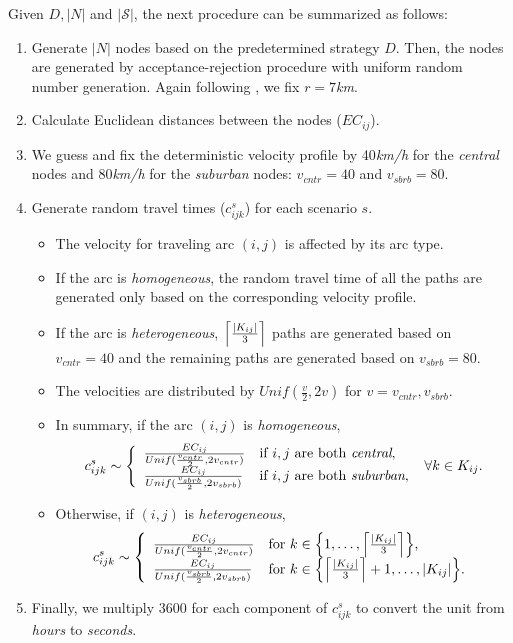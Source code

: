 Given $D,|N|$ and $|\mathcal{S}|$, the next procedure can be summarized as follows:
\begin{enumerate}
	\item Generate $|N|$ nodes based on the predetermined strategy $D$. Then, the nodes are generated by acceptance-rejection procedure with uniform random number generation. Again following \cite{journal:TPP2017}, we fix $r=7$\textit{km}. 
	\item Calculate Euclidean distances between the nodes ($EC_{ij}$).
	\item We guess and fix the deterministic velocity profile by 40\textit{km/h} for the \textit{central} nodes and 80\textit{km/h} for the \textit{suburban} nodes: $v_{cntr}=40$ and $v_{sbrb}=80$.
	\item Generate random travel times ($c_{ijk}^{s}$) for each scenario $s$.
	\begin{itemize}
		\item The velocity for traveling arc $(i,j)$ is affected by its arc type.
		\item If the arc is \textit{homogeneous}, the random travel time of all the paths are generated only based on the corresponding velocity profile.
		\item If the arc is \textit{heterogeneous}, $\ceil*{\frac{|K_{ij}|}{3}}$ paths are generated based on $v_{cntr}=40$ and the remaining paths are generated based on $v_{sbrb}=80$. 
		\item The velocities are distributed by $Unif(\frac{v}{2},2v)$ for $v=v_{cntr},v_{sbrb}$.
		\item In summary, if the arc $(i,j)$ is \textit{homogeneous}, 
		\begin{align*}
		c_{ijk}^{s}\sim\left\{ \begin{array}{ll} \frac{EC_{ij}}{Unif(\frac{v_{cntr}}{2},2v_{cntr})} & \textrm{if $i,j$ are both \textit{central},} \\
		\frac{EC_{ij}}{Unif(\frac{v_{sbrb}}{2},2v_{sbrb})} & \textrm{if $i,j$ are both \textit{suburban},}	\end{array} \right.\ \forall k\in K_{ij}.
		\end{align*}
		\item Otherwise, if $(i,j)$ is \textit{heterogeneous},
		\begin{align*}
		c_{ijk}^{s}\sim\left\{ \begin{array}{ll} \frac{EC_{ij}}{Unif(\frac{v_{cntr}}{2},2v_{cntr})} & \textrm{for $k\in\left\{1,\ldots,\ceil*{\frac{|K_{ij}|}{3}}\right\}$,} \\
		\frac{EC_{ij}}{Unif(\frac{v_{sbrb}}{2},2v_{sbrb})} & \textrm{for $k\in\left\{\ceil*{\frac{|K_{ij}|}{3}}+1,\ldots,|K_{ij}|\right\}$.}	\end{array} \right.
		\end{align*}
	\end{itemize}
	\item Finally, we multiply 3600 for each component of $c_{ijk}^{s}$ to convert the unit from \textit{hours} to \textit{seconds}.
\end{enumerate}


